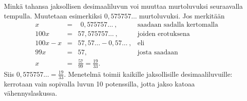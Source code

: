Minkä tahansa jaksollisen desimaaliluvun voi muuttaa murtoluvuksi seuraavalla tempulla.
Muutetaan esimerkiksi $0,575757\ldots$ murtoluvuksi. Jos merkitään
\[
\begin{array}{rcll}
x &=& \ \, 0,575757 \ldots\ , &\textrm{saadaan sadalla kertomalla} \\
100x &=& 57,575757 \ldots \ , &\textrm{joiden erotuksena} \\
100x - x &=& 57,57 \ldots - 0,57 \ldots \ , & \textrm{eli} \\
99x &=& 57, & \textrm{josta saadaan} \\
x &=& \frac{57}{99} = \frac{19}{33}.
\end{array}
\]
Siis $0,575757\ldots = \frac{19}{33}$. Menetelmä toimii kaikille jaksollisille
desimaaliluvuille: kerrotaan vain sopivalla luvun 10 potenssilla, jotta jakso
katoaa vähennyslaskussa.


